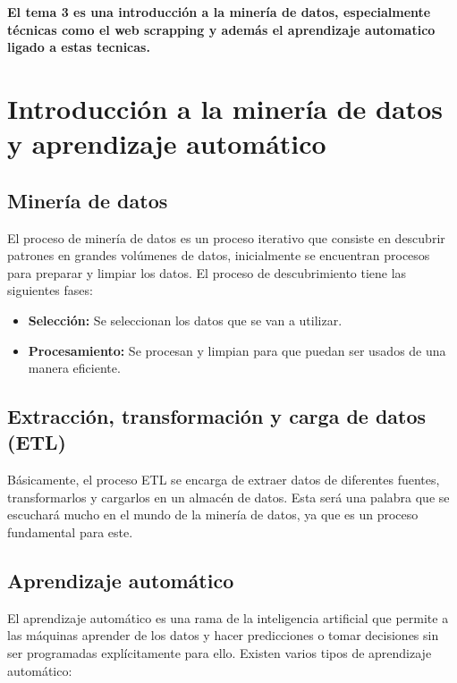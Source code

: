{\bfseries El tema 3 es una introducción a la minería de datos, especialmente técnicas como el web scrapping y además el aprendizaje 
automatico ligado a estas tecnicas.}

\section{\bfseries Introducción a la minería de datos y aprendizaje automático}

\subsection{\bfseries Minería de datos}
El proceso de minería de datos es un proceso iterativo que consiste en descubrir patrones en grandes volúmenes de datos, inicialmente
se encuentran procesos para preparar y limpiar los datos. El proceso de descubrimiento tiene las siguientes fases:
\begin{itemize}
    \item \textbf{Selección:} Se seleccionan los datos que se van a utilizar.
    \item \textbf{Procesamiento:} Se procesan y limpian para que puedan ser usados de una manera eficiente.
\end{itemize}

\subsection{\bfseries Extracción, transformación y carga de datos (ETL)}
Básicamente, el proceso ETL se encarga de extraer datos de diferentes fuentes, transformarlos y cargarlos en un almacén de datos.
Esta será una palabra que se escuchará mucho en el mundo de la minería de datos, ya que es un proceso fundamental para este.



\subsection{\bfseries Aprendizaje automático}

El aprendizaje automático es una rama de la inteligencia artificial que permite a las máquinas aprender de los datos y hacer predicciones o tomar decisiones sin ser programadas explícitamente para ello. Existen varios tipos de aprendizaje automático:

